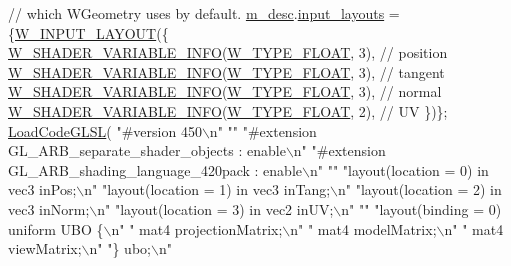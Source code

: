 \begin{DoxyCode}
        \textcolor{comment}{// which WGeometry uses by default.}
        \hyperlink{class_w_shader_a887bf7b5a672bcc901eb8999713d8cfe}{m\_desc}.\hyperlink{struct_w___s_h_a_d_e_r___d_e_s_c_a994385c2ccd44ff6b0879ac15ba035cd}{input\_layouts} = \{\hyperlink{group__engineclass_ga4da83d88937c92af31c7178c6dd76b7a}{W\_INPUT\_LAYOUT}(\{
            \hyperlink{group__engineclass_gac58914f40a8d012635bf7704c3a74409}{W\_SHADER\_VARIABLE\_INFO}(\hyperlink{group__engineclass_ggaeca2b79f62ba669ae9c5dbc516b66522ae4539d4f3784b6d80f44e9dd4867fa00}{W\_TYPE\_FLOAT}, 3), \textcolor{comment}{// position}
            \hyperlink{group__engineclass_gac58914f40a8d012635bf7704c3a74409}{W\_SHADER\_VARIABLE\_INFO}(\hyperlink{group__engineclass_ggaeca2b79f62ba669ae9c5dbc516b66522ae4539d4f3784b6d80f44e9dd4867fa00}{W\_TYPE\_FLOAT}, 3), \textcolor{comment}{// tangent}
            \hyperlink{group__engineclass_gac58914f40a8d012635bf7704c3a74409}{W\_SHADER\_VARIABLE\_INFO}(\hyperlink{group__engineclass_ggaeca2b79f62ba669ae9c5dbc516b66522ae4539d4f3784b6d80f44e9dd4867fa00}{W\_TYPE\_FLOAT}, 3), \textcolor{comment}{// normal}
            \hyperlink{group__engineclass_gac58914f40a8d012635bf7704c3a74409}{W\_SHADER\_VARIABLE\_INFO}(\hyperlink{group__engineclass_ggaeca2b79f62ba669ae9c5dbc516b66522ae4539d4f3784b6d80f44e9dd4867fa00}{W\_TYPE\_FLOAT}, 2), \textcolor{comment}{// UV}
        \})\};
        \hyperlink{class_w_shader_a29cffc471a569bbd669969feed3245d5}{LoadCodeGLSL}(
            \textcolor{stringliteral}{"#version 450\(\backslash\)n"}
            \textcolor{stringliteral}{""}
            \textcolor{stringliteral}{"#extension GL\_ARB\_separate\_shader\_objects : enable\(\backslash\)n"}
            \textcolor{stringliteral}{"#extension GL\_ARB\_shading\_language\_420pack : enable\(\backslash\)n"}
            \textcolor{stringliteral}{""}
            \textcolor{stringliteral}{"layout(location = 0) in vec3 inPos;\(\backslash\)n"}
            \textcolor{stringliteral}{"layout(location = 1) in vec3 inTang;\(\backslash\)n"}
            \textcolor{stringliteral}{"layout(location = 2) in vec3 inNorm;\(\backslash\)n"}
            \textcolor{stringliteral}{"layout(location = 3) in vec2 inUV;\(\backslash\)n"}
            \textcolor{stringliteral}{""}
            \textcolor{stringliteral}{"layout(binding = 0) uniform UBO \{\(\backslash\)n"}
            \textcolor{stringliteral}{"   mat4 projectionMatrix;\(\backslash\)n"}
            \textcolor{stringliteral}{"   mat4 modelMatrix;\(\backslash\)n"}
            \textcolor{stringliteral}{"   mat4 viewMatrix;\(\backslash\)n"}
            \textcolor{stringliteral}{"\} ubo;\(\backslash\)n"}

\end{DoxyCode}
